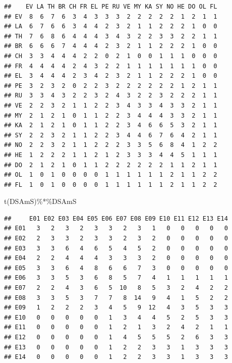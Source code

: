 \documentclass[
  notitlepage,
  onecolumn,
  openany]{book}
\newenvironment{Shaded}{\begin{snugshade}}{\end{snugshade}}
\newcommand{\FunctionTok}[1]{\textcolor[rgb]{0.00,0.00,0.00}{#1}}
\newcommand{\NormalTok}[1]{#1}
\newcommand{\SpecialCharTok}[1]{\textcolor[rgb]{0.00,0.00,0.00}{#1}}
\begin{document}
\begin{verbatim}
##    EV LA TH BR CH FR EL PE RU VE MY KA SY NO HE DO OL FL
## EV  8  6  7  6  3  4  3  3  3  2  2  2  2  2  1  2  1  1
## LA  6  7  6  6  3  4  4  2  3  2  1  1  2  2  2  1  0  0
## TH  7  6  8  6  4  4  4  3  4  3  2  2  3  3  2  2  1  1
## BR  6  6  6  7  4  4  4  2  3  2  1  1  2  2  2  1  0  0
## CH  3  3  4  4  4  2  2  0  2  1  0  0  1  1  1  0  0  0
## FR  4  4  4  4  2  4  3  2  2  1  1  1  1  1  1  1  0  0
## EL  3  4  4  4  2  3  4  2  3  2  1  1  2  2  2  1  0  0
## PE  3  2  3  2  0  2  2  3  2  2  2  2  2  2  1  2  1  1
## RU  3  3  4  3  2  2  3  2  4  3  2  2  3  2  2  2  1  1
## VE  2  2  3  2  1  1  2  2  3  4  3  3  4  3  3  2  1  1
## MY  2  1  2  1  0  1  1  2  2  3  4  4  4  3  3  2  1  1
## KA  2  1  2  1  0  1  1  2  2  3  4  6  6  5  3  2  1  1
## SY  2  2  3  2  1  1  2  2  3  4  4  6  7  6  4  2  1  1
## NO  2  2  3  2  1  1  2  2  2  3  3  5  6  8  4  1  2  2
## HE  1  2  2  2  1  1  2  1  2  3  3  3  4  4  5  1  1  1
## DO  2  1  2  1  0  1  1  2  2  2  2  2  2  1  1  2  1  1
## OL  1  0  1  0  0  0  0  1  1  1  1  1  1  2  1  1  2  2
## FL  1  0  1  0  0  0  0  1  1  1  1  1  1  2  1  1  2  2
\end{verbatim}

\begin{Shaded}
\begin{Highlighting}[]
\FunctionTok{t}\NormalTok{(DSAmS)}\SpecialCharTok{\%*\%}\NormalTok{DSAmS}
\end{Highlighting}
\end{Shaded}

\begin{verbatim}
##     E01 E02 E03 E04 E05 E06 E07 E08 E09 E10 E11 E12 E13 E14
## E01   3   2   3   2   3   3   2   3   1   0   0   0   0   0
## E02   2   3   3   2   3   3   2   3   2   0   0   0   0   0
## E03   3   3   6   4   6   5   4   5   2   0   0   0   0   0
## E04   2   2   4   4   4   3   3   3   2   0   0   0   0   0
## E05   3   3   6   4   8   6   6   7   3   0   0   0   0   0
## E06   3   3   5   3   6   8   5   7   4   1   1   1   1   1
## E07   2   2   4   3   6   5  10   8   5   3   2   4   2   2
## E08   3   3   5   3   7   7   8  14   9   4   1   5   2   2
## E09   1   2   2   2   3   4   5   9  12   4   3   5   3   3
## E10   0   0   0   0   0   1   3   4   4   5   2   5   3   3
## E11   0   0   0   0   0   1   2   1   3   2   4   2   1   1
## E12   0   0   0   0   0   1   4   5   5   5   2   6   3   3
## E13   0   0   0   0   0   1   2   2   3   3   1   3   3   3
## E14   0   0   0   0   0   1   2   2   3   3   1   3   3   3
\end{verbatim}
\end{document}

